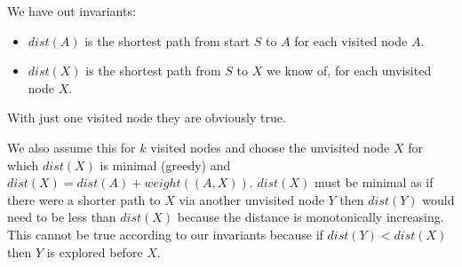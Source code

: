 \documentclass[12pt]{article}
\begin{document}
We have out invariants:
\begin{itemize}
	\item $dist(A)$ is the shortest path from start $S$ to $A$ for each visited node $A$.
	\item $dist(X)$ is the shortest path from $S$ to $X$ we know of, for each unvisited node $X$.
\end{itemize}

With just one visited node they are obviously true.

We also assume this for $k$ visited nodes and choose the unvisited node $X$ for which $dist(X)$ is minimal (greedy) and $dist(X) = dist(A) + weight((A, X))$. $dist(X)$ must be minimal as if there were a shorter path to $X$ via another unvisited node $Y$ then $dist(Y)$ would need to be less than $dist(X)$ because the distance is monotonically increasing. This cannot be true according to our invariants because if $dist(Y) < dist(X)$ then $Y$ is explored before $X$.
\end{document}
